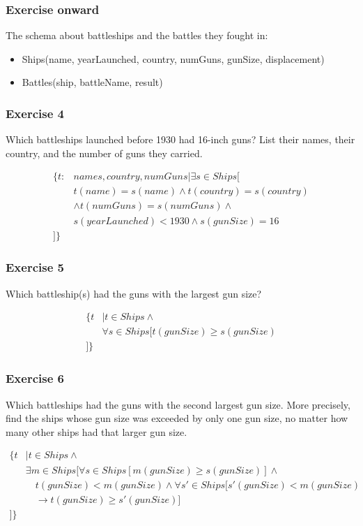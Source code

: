 \documentclass{beamer}
\begin{document}
\begin{frame}[fragile]
\frametitle{Exercise onward}
The schema about battleships and the battles they fought in:
\begin{itemize}
\item Ships(name, yearLaunched, country, numGuns, gunSize, displacement)
\item Battles(ship, battleName, result)
\end{itemize}
\end{frame}

\begin{frame}[fragile]
\frametitle{Exercise 4}
Which battleships launched before 1930 had 16-inch guns? List their names, their country, and the number of guns they carried.

\begin{align*}
\{t:& names, country, numGuns|\exists s\in Ships[ \\
& t(name)=s(name) \wedge t(country)=s(country) \\ 
& \wedge  t(numGuns)=s(numGuns)\wedge \\
&s(yearLaunched)<1930 \wedge s(gunSize)=16\\
]\}
\end{align*}
\end{frame}


\begin{frame}[fragile]
\frametitle{Exercise 5}
Which battleship(s) had the guns with the largest gun size?

\begin{align*}
\{t&| t\in Ships \wedge \\ 
&\forall s\in Ships [t(gunSize)\geq s(gunSize)\\
]\}
\end{align*}
\end{frame}

\begin{frame}[fragile]
\frametitle{Exercise 6}
Which battleships had the guns with the second largest gun size. More precisely, find the ships whose gun size was exceeded by only one gun size, no matter how many other ships had that larger gun size. 

\begin{align*}
\{t&| t\in Ships \wedge \\ 
&\exists m \in Ships \Big[\forall s\in Ships [m(gunSize)\geq s(gunSize)] \wedge  \\
& \quad t(gunSize) < m(gunSize) \wedge \forall s' \in Ships [s'(gunSize)< m(gunSize)  \\
& \quad \rightarrow t(gunSize)\geq s'(gunSize)]\\
\Big]\}
\end{align*}
\end{frame}
\end{document}
